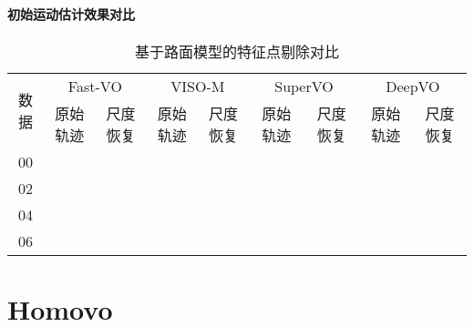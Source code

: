 \subsubsection{初始运动估计效果对比}
\begin{table}[h]
    \caption{基于路面模型的特征点剔除对比}
    \label{tab:flat_removal}
    \begin{center}
    \begin{tabular}{ccccccccc}
    \hline
    \multirow{2}{*}{数据} & \multicolumn{2}{c}{Fast-VO} & \multicolumn{2}{c}{VISO-M} & \multicolumn{2}{c}{SuperVO} & \multicolumn{2}{c}{DeepVO} \\
     \cline{2-3} \cline{4-5}  \cline{6-7}    \cline{8-9} 
    & 原始轨迹   & 尺度恢复  & 原始轨迹   & 尺度恢复 & 原始轨迹   & 尺度恢复 & 原始轨迹   & 尺度恢复   \\ \hline
  00&\\
  02&\\
  04&\\
  06&\\  
    \end{tabular}
\end{center}
\end{table}
\fi

\chapter{Homovo}


%


